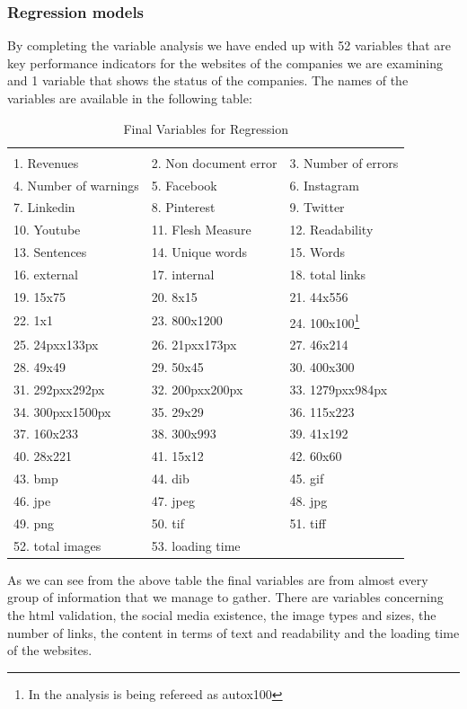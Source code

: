\documentclass{article}
\begin{document}
\subsubsection{Regression models}
By completing the variable analysis we have ended up with 52 variables that are key performance indicators for the websites of the companies we are examining and 1 variable that shows the status of the companies. The names of the variables are available in the following table:
\begin{table}[H]
\centering
\caption{Final Variables for Regression}
\begin{tabular}{lll}
\hline & & \\
1.	Revenues
& 2.	Non document error
& 3.	Number of errors
\\4.	Number of warnings
& 5.	Facebook
& 6.	Instagram
\\7.	Linkedin
& 8.	Pinterest
& 9.	Twitter
\\10.	Youtube
& 11.	Flesh Measure
& 12.	Readability
\\13.	Sentences
& 14.	Unique words
& 15.	Words
\\16.	external
& 17.	internal
& 18.	total links
\\19.	15x75
& 20.	8x15
& 21.	44x556
\\22.	1x1
& 23.	800x1200
& 24.	100x100\footnote{In the analysis is being refereed as autox100}
\\25.	24pxx133px
& 26.	21pxx173px
& 27.	46x214
\\28.	49x49
& 29.	50x45
& 30.	400x300
\\31.	292pxx292px
& 32.	200pxx200px
& 33.	1279pxx984px
\\34.	300pxx1500px
& 35.	29x29
& 36.	115x223
\\37.	160x233
& 38.	300x993
& 39.	41x192
\\40.	28x221
& 41.	15x12
& 42.	60x60
\\43.	bmp
& 44.	dib
& 45.	gif
\\46.	jpe
& 47.	jpeg
& 48.	jpg
\\49.	png
& 50.	tif
& 51.	tiff
\\52.	total images
& 53.	loading time     
\\ \hline
\end{tabular}
\end{table}
As we can see from the above table the final variables are from almost every group of information that we manage to gather. There are variables concerning the html validation, the social media existence, the image types and sizes, the number of links, the content in terms of text and readability and the loading time of the websites.\\
\end{document}
